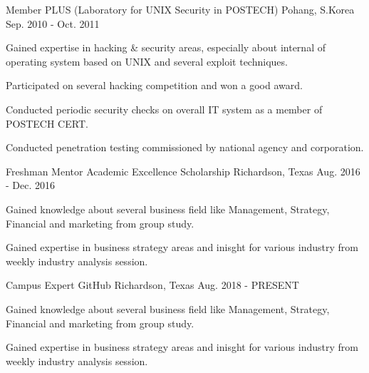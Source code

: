 \begin{cventries}
  \cventry
    {Member} %
    {PLUS (Laboratory for UNIX Security in POSTECH)} %
    {Pohang, S.Korea} %
    {Sep. 2010 - Oct. 2011} %
    {
      \begin{cvitems} %
        \item {Gained expertise in hacking \& security areas, especially about internal of operating system based on UNIX and several exploit techniques.}
        \item {Participated on several hacking competition and won a good award.}
        \item {Conducted periodic security checks on overall IT system as a member of POSTECH CERT.}
        \item {Conducted penetration testing commissioned by national agency and corporation.}
      \end{cvitems}
    }

  \cventry
    {Freshman Mentor} %
    {Academic Excellence Scholarship} %
    {Richardson, Texas} %
    {Aug. 2016 - Dec. 2016} %
    {
      \begin{cvitems} %
        \item {Gained knowledge about several business field like Management, Strategy, Financial and marketing from group study.}
        \item {Gained expertise in business strategy areas and inisght for various industry from weekly industry analysis session.}
      \end{cvitems}
    }

  \cventry
    {Campus Expert} %
    {GitHub} %
    {Richardson, Texas} %
    {Aug. 2018 - PRESENT} %
    {
      \begin{cvitems} %
        \item {Gained knowledge about several business field like Management, Strategy, Financial and marketing from group study.}
        \item {Gained expertise in business strategy areas and inisght for various industry from weekly industry analysis session.}
      \end{cvitems}
    }

\end{cventries}
